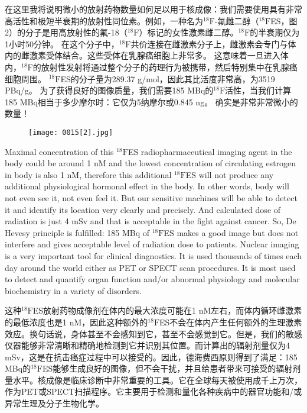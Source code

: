 \documentclass[dvipsnames, svgnames,a4paper,11pt]{article}
\begin{document}
在这里我将说明微小的放射药物数量如何足以用于核成像：我们需要使用具有非常高活性和极短半衰期的放射性同位素。例如，一种名为${}^{18}\text{F}$-氟雌二醇（${}^{18}\text{F}$ES，图2）的分子是用高放射性的氟-18（${}^{18}\text{F}$）标记的女性激素雌二醇。${}^{18}\text{F}$的半衰期仅为1小时50分钟。 在这个分子中，${}^{18}\text{F}$共价连接在雌激素分子上，雌激素会专门与体内的雌激素受体结合。这些受体在乳腺癌细胞上非常多。 这意味着一旦进入体内，${}^{18}\text{F}$的放射性发射将通过整个分子的药理行为被携带，然后特别集中在乳腺癌细胞周围。  ${}^{18}\text{F}$ES的分子量为289.37 g/mol，因此其比活度非常高，为3519 PBq/g。  为了获得良好的图像质量，我们需要185 MBq的${}^{18}\text{F}$活性，当我们计算185 MBq相当于多少摩尔时：它仅为5纳摩尔或0.845 ng。 确实是非常非常微小的数量！

\begin{figure}[h]
      \centering
      \texttt{[image: 0015[2].jpg]}
       \label{fig2}
  \end{figure}

Maximal concentration of this ${}^{18}\text{F}$ES radiopharmaceutical imaging agent in the body could be around 1 nM and the lowest concentration of circulating estrogen in body is also 1 nM, therefore this additional ${}^{18}\text{F}$ES will not produce any additional physiological hormonal effect in the body. In other words, body will not even see it, not even feel it. But our sensitive machines will be able to detect it and identify its location very clearly and precisely. And calculated dose of radiation is just 4 mSv and that is acceptable in the fight against cancer. So, De Hevesy principle is fulfilled: 185 MBq of ${}^{18}\text{F}$ES makes a good image but does not interfere and gives acceptable level of radiation dose to patients. Nuclear imaging is a very important tool for clinical diagnostics. It is used thousands of times each day around the world either as PET or SPECT scan procedures. It is most used to detect and quantify organ function and/or abnormal physiology and molecular biochemistry in a variety of disorders.

这种${}^{18}\text{F}$ES放射药物成像剂在体内的最大浓度可能在1 nM左右，而体内循环雌激素的最低浓度也是1 nM，因此这种额外的${}^{18}\text{F}$ES不会在体内产生任何额外的生理激素效应。换句话说，身体甚至不会感知到它，甚至不会感觉到它。但是，我们的敏感仪器能够非常清晰和精确地检测到它并识别其位置。而计算出的辐射剂量仅为4 mSv，这是在抗击癌症过程中可以接受的。因此，德海费西原则得到了满足：185 MBq的${}^{18}\text{F}$ES能够生成良好的图像，但不会干扰，并且给患者带来可接受的辐射剂量水平。核成像是临床诊断中非常重要的工具。它在全球每天被使用成千上万次，作为PET或SPECT扫描程序。它主要用于检测和量化各种疾病中的器官功能和/或异常生理及分子生物化学。
\end{document}

